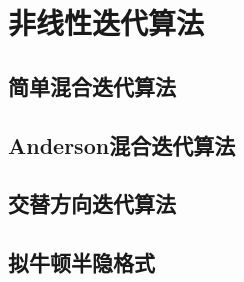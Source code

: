 \section{非线性迭代算法}

\subsection{简单混合迭代算法}

\subsection{Anderson混合迭代算法}

\subsection{交替方向迭代算法}

\subsection{拟牛顿半隐格式}
